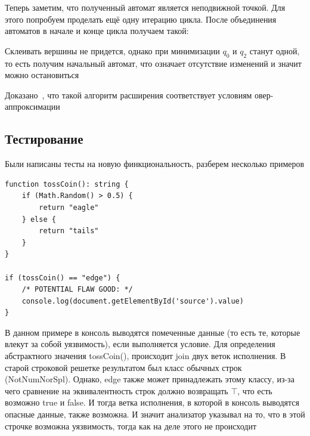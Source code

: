Теперь заметим, что полученный автомат является неподвижной точкой. Для этого попробуем проделать ещё одну итерацию цикла. После объединения автоматов в начале и конце цикла получаем такой:

\begin{figure}[h]
    \centering
\end{figure}

Склеивать вершины не придется, однако при минимизации $q_0$ и $q_2$ станут одной, то есть получим начальный автомат, что означает отсутствие изменений и значит можно остановиться 

Доказано~\cite{widening}, что такой алгоритм расширения соответствует условиям овер-аппроксимации


\newpage
\subsection{Тестирование}
Были написаны тесты на новую финкциональность, разберем несколько примеров

\begin{lstlisting}[caption={Пример CWE тестов}]
function tossCoin(): string {
    if (Math.Random() > 0.5) {
        return "eagle"
    } else {
        return "tails"
    }
}

if (tossCoin() == "edge") {
    /* POTENTIAL FLAW GOOD: */
    console.log(document.getElementById('source').value)
}
\end{lstlisting}
    
В данном примере в консоль выводятся помеченные данные (то есть те, которые влекут за собой уязвимость), если выполняется условие. Для определения абстрактного значения tossCoin(), происходит join двух веток исполнения. В старой строковой решетке результатом был класс обычных строк (NotNumNorSpl). Однако, edge также может принадлежать этому классу, из-за чего сравнение на эквивалентность строк должно возвращать $\top$, что есть возможно true и false. И тогда ветка исполнения, в которой в консоль выводятся опасные данные, также возможна. И значит анализатор указывал на то, что в этой строчке возможна уязвимость, тогда как на деле этого не происходит

